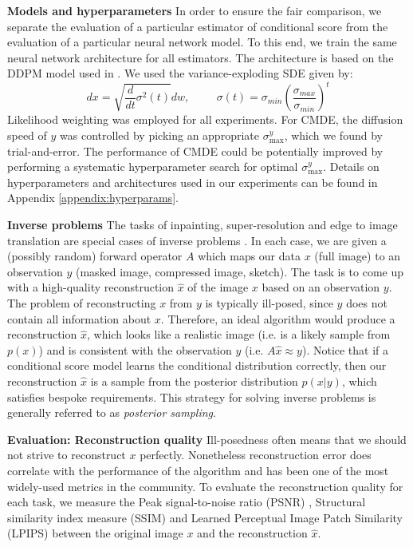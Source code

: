 \noindent
\textbf{Models and hyperparameters} In order to ensure the fair comparison, we separate the evaluation of a particular estimator of conditional score from the evaluation of a particular neural network model. To this end, we train the same neural network architecture for all estimators. The architecture is based on the DDPM model used in \cite{ho2020denoising, song2021sde}. 
We used the variance-exploding SDE \cite{song2021sde} given by: 
$$dx = \sqrt{\frac{d}{dt}\sigma^2(t)}dw, \hspace{1cm}
\sigma(t) = \sigma_{min} \left(\frac{\sigma_{max}}{\sigma_{min}}\right)^t$$
Likelihood weighting was employed for all experiments. For CMDE, the diffusion speed of $y$ was controlled by picking an appropriate $\sigma^y_{\max}$, which we found by trial-and-error. The performance of CMDE could be potentially improved by performing a systematic hyperparameter search for optimal $\sigma^y_{\max}$.
Details on hyperparameters and architectures used in our experiments can be found in Appendix \ref{appendix:hyperparams}.

\noindent 
\textbf{Inverse problems} The tasks of inpainting, super-resolution and edge to image translation are special cases of inverse problems \cite{arridge2019ip, muller2012ip}. In each case, we are given a (possibly random) forward operator $A$ which maps our data $x$ (full image) to an observation $y$ (masked image, compressed image, sketch). The task is to come up with a high-quality reconstruction $\hat{x}$ of the image $x$ based on an observation $y$. The problem of reconstructing $x$ from $y$ is typically ill-posed, since $y$ does not contain all information about $x$. Therefore, an ideal algorithm would produce a reconstruction $\hat{x}$, which looks like a realistic image (i.e. is a likely sample from $p(x)$) and is consistent with the observation $y$ (i.e. $A\hat{x} \approx y$). Notice that if a conditional score model learns the conditional distribution correctly, then our reconstruction $\hat{x}$ is a sample from the posterior distribution $p(x | y)$, which satisfies bespoke requirements. This strategy for solving inverse problems is generally referred to as \emph{posterior sampling}.

\noindent
\textbf{Evaluation: Reconstruction quality} Ill-posedness often means that we should not strive to reconstruct $x$ perfectly. Nonetheless reconstruction error does correlate with the performance of the algorithm and has been one of the most widely-used metrics in the community. To evaluate the reconstruction quality for each task, we measure the Peak signal-to-noise ratio (PSNR) \cite{zhou2004psnr+ssim}, Structural similarity index measure (SSIM) \cite{zhou2004psnr+ssim} and Learned Perceptual Image Patch Similarity (LPIPS) \cite{zhang2018lpips} between the original image $x$ and the reconstruction $\hat{x}$.

